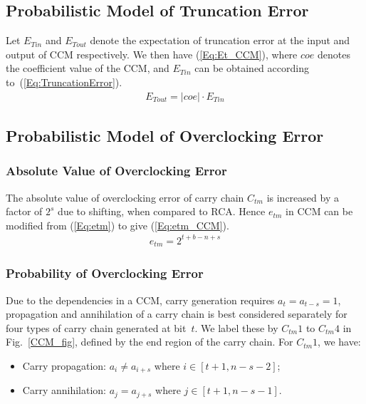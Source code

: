 \documentclass[prodmode,acmtrets]{acmsmall} %
\begin{document}
\subsection{Probabilistic Model of Truncation Error}
Let $E_{Tin}$ and $E_{Tout}$ denote the expectation of truncation error at the input and output of CCM respectively. We then have (\ref{Eq:Et_CCM}), where $coe$ denotes the coefficient value of the CCM, and $E_{Tin}$ can be obtained according to~(\ref{Eq:TruncationError}).
%
\begin{eqnarray}\label{Eq:Et_CCM}
  E_{Tout}=|coe|\cdot E_{Tin}
\end{eqnarray}

\subsection{Probabilistic Model of Overclocking Error}
\subsubsection{Absolute Value of Overclocking Error}
The absolute value of overclocking error of carry chain $C_{tm}$ is increased by a factor of $2^s$ due to shifting, when compared to RCA. Hence $e_{tm}$ in CCM can be modified from (\ref{Eq:etm}) to give (\ref{Eq:etm_CCM}).
%
\begin{eqnarray}\label{Eq:etm_CCM}
  e_{tm}=2^{t+b-n+s}
\end{eqnarray}

\subsubsection{Probability of Overclocking Error}
Due to the dependencies in a CCM, carry generation requires $a_t=a_{t-s}=1$, propagation and annihilation of a carry chain is best considered separately for four types of carry chain generated at bit~$t$. We label these by $C_{tm}1$ to $C_{tm}4$ in Fig.~\ref{CCM_fig}, defined by the end region of the carry chain. For $C_{tm}1$, we have:

\begin{itemize}
  \item Carry propagation: $a_i\neq a_{i+s}$ where $i\in[t+1,n-s-2]$;
  \item Carry annihilation: $a_j=a_{j+s}$ where $j\in[t+1,n-s-1]$.
\end{itemize}
\end{document}
